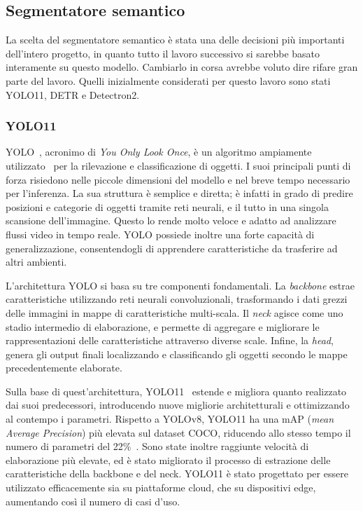 \documentclass[12pt]{report}
\begin{document}
\subsection{Segmentatore semantico}
\label{sec:segmentatore_semantico}

La scelta del segmentatore semantico è stata una delle decisioni più importanti dell'intero progetto, in quanto tutto il lavoro successivo si sarebbe basato interamente su questo modello. Cambiarlo in corsa avrebbe voluto dire rifare gran parte del lavoro. Quelli inizialmente considerati per questo lavoro sono stati YOLO11, DETR e Detectron2.

\subsubsection{YOLO11}
\label{sec:yolo11}

YOLO~\cite{JIANG20221066}, acronimo di \textit{You Only Look Once}, è un algoritmo ampiamente utilizzato~\cite{sultana2020review} per la rilevazione e classificazione di oggetti. I suoi principali punti di forza risiedono nelle piccole dimensioni del modello e nel breve tempo necessario per l'inferenza. La sua struttura è semplice e diretta; è infatti in grado di predire posizioni e categorie di oggetti tramite reti neurali, e il tutto in una singola scansione dell'immagine. Questo lo rende molto veloce e adatto ad analizzare flussi video in tempo reale. YOLO possiede inoltre una forte capacità di generalizzazione, consentendogli di apprendere caratteristiche da trasferire ad altri ambienti.

L'architettura YOLO si basa su tre componenti fondamentali. La \textit{backbone} estrae caratteristiche utilizzando reti neurali convoluzionali, trasformando i dati grezzi delle immagini in mappe di caratteristiche multi-scala. Il \textit{neck} agisce come uno stadio intermedio di elaborazione, e permette di aggregare e migliorare le rappresentazioni delle caratteristiche attraverso diverse scale. Infine, la \textit{head}, genera gli output finali localizzando e classificando gli oggetti secondo le mappe precedentemente elaborate.

Sulla base di quest'architettura, YOLO11~\cite{yolo11_ultralytics} estende e migliora quanto realizzato dai suoi predecessori, introducendo nuove migliorie architetturali e ottimizzando al contempo i parametri. Rispetto a YOLOv8, YOLO11 ha una mAP (\textit{mean Average Precision}) più elevata sul dataset COCO, riducendo allo stesso tempo il numero di parametri del 22\%~\cite{khanam2024yolov11overviewkeyarchitectural}. Sono state inoltre raggiunte velocità di elaborazione più elevate, ed è stato migliorato il processo di estrazione delle caratteristiche della backbone e del neck. YOLO11 è stato progettato per essere utilizzato efficacemente sia su piattaforme cloud, che su dispositivi edge, aumentando così il numero di casi d'uso.
\end{document}
